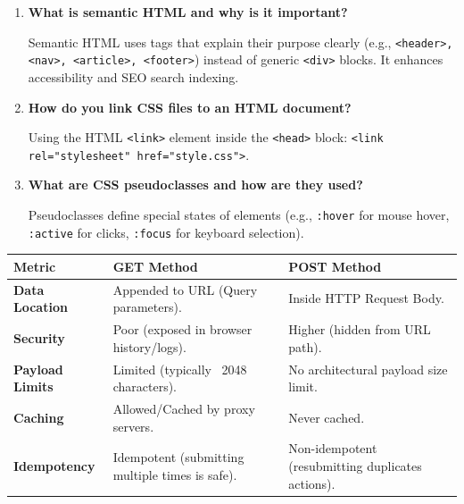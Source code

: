 \documentclass[12pt,a4paper]{article}
\newcommand{\Q}[1]{\textbf{#1}\par\noindent\ignorespaces}
\renewcommand{\arraystretch}{1.45}
\begin{document}
\begin{tcolorbox}[exambox, title={\textbf{Frequently Asked / Viva Questions}}]
\begin{enumerate}[leftmargin=*, label=\textbf{Q\arabic*.}, itemsep=5pt]
  \item \Q{What is semantic HTML and why is it important?}
        Semantic HTML uses tags that explain their purpose clearly (e.g., \texttt{<header>, <nav>, <article>, <footer>}) instead of generic \texttt{<div>} blocks. It enhances accessibility and SEO search indexing.
        
  \item \Q{How do you link CSS files to an HTML document?}
        Using the HTML \texttt{<link>} element inside the \texttt{<head>} block: \texttt{<link rel="stylesheet" href="style.css">}.
        
  \item \Q{What are CSS pseudoclasses and how are they used?}
        Pseudoclasses define special states of elements (e.g., \texttt{:hover} for mouse hover, \texttt{:active} for clicks, \texttt{:focus} for keyboard selection).
\end{enumerate}
\end{tcolorbox}

\begin{tcolorbox}[tikzbox, title={Form Submission: GET vs. POST comparison}]
\centering
{\renewcommand{\arraystretch}{1.45}%
\begin{tabularx}{\linewidth}{|B{3.2cm}|Y|Y|}
\hline
\textbf{Metric} & \textbf{GET Method} & \textbf{POST Method} \\
\hline
\textbf{Data Location} & Appended to URL (Query parameters). & Inside HTTP Request Body. \\
\hline
\textbf{Security} & Poor (exposed in browser history/logs). & Higher (hidden from URL path). \\
\hline
\textbf{Payload Limits} & Limited (typically ~2048 characters). & No architectural payload size limit. \\
\hline
\textbf{Caching} & Allowed/Cached by proxy servers. & Never cached. \\
\hline
\textbf{Idempotency} & Idempotent (submitting multiple times is safe). & Non-idempotent (resubmitting duplicates actions). \\
\hline
\end{tabularx}}
\end{tcolorbox}
\end{document}
